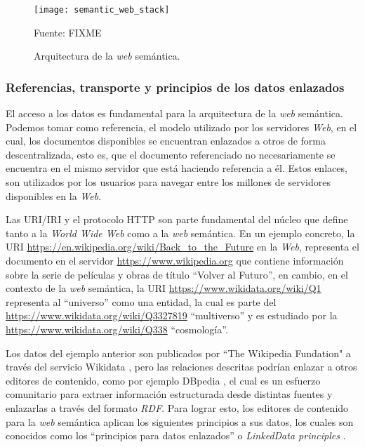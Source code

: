 \begin{figure}
    \centering
    \texttt{[image: semantic\_web\_stack]}
    \caption{Arquitectura de la \textit{web} semántica.} Fuente: FIXME
    \label{fig:semantic-web-arq}
\end{figure}

\subsubsection{Referencias, transporte y principios de los datos enlazados}

El acceso a los datos es fundamental para la arquitectura de la \textit{web}
semántica. Podemos tomar como referencia, el modelo utilizado por los servidores
\textit{Web}, en el cual, los documentos disponibles se encuentran enlazados a
otros de forma descentralizada, esto es, que el documento referenciado no
necesariamente se encuentra en el mismo servidor que está haciendo referencia a
él. Estos enlaces, son utilizados por los usuarios para navegar entre los
millones de servidores disponibles en la \textit{Web}.

Las URI/IRI y el protocolo HTTP son parte fundamental del núcleo que define
tanto a la \textit{World Wide Web} como a la \textit{web} semántica. En un
ejemplo concreto, la URI \url{https://en.wikipedia.org/wiki/Back_to_the_Future}
en la \textit{Web}, representa el documento en el servidor
\url{https://www.wikipedia.org} que contiene información sobre la serie de
películas y obras de título ``Volver al Futuro'', en cambio, en el contexto de
la \textit{web} semántica, la URI \url{https://www.wikidata.org/wiki/Q1}
representa al ``universo'' como una entidad, la cual es parte del
\url{https://www.wikidata.org/wiki/Q3327819} ``multiverso'' y es estudiado por
la \url{https://www.wikidata.org/wiki/Q338} ``cosmología''.

Los datos del ejemplo anterior son publicados por ``The Wikipedia Fundation" a
través del servicio Wikidata \cite{vrandevcic2014wikidata}, pero las relaciones
descritas podrían enlazar a otros editores de contenido, como por ejemplo
DBpedia \cite{valsecchi2015dbpedia}, el cual es un esfuerzo comunitario para
extraer información estructurada desde distintas fuentes y enlazarlas a través
del formato \textit{RDF}. Para lograr esto, los editores de contenido para la
\textit{web} semántica aplican los siguientes principios a sus datos, los cuales
son conocidos como los ``principios para datos enlazados'' o \textit{LinkedData
principles} \cite{bizer2011linked}.

